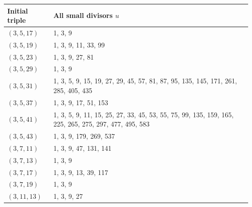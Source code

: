 \small
\setlength{\LTleft}{\fill}
\setlength{\LTright}{\fill}
\begin{longtable}{@{}l p{11.4cm}@{}}
\toprule
Initial triple & All small divisors $u$\\
\midrule
\endhead
$(3,5,17)$ & 1, 3, 9\\[3pt]
$(3,5,19)$ & 1, 3, 9, 11, 33, 99\\[3pt]
$(3,5,23)$ & 1, 3, 9, 27, 81\\[3pt]
$(3,5,29)$ & 1, 3, 9\\[3pt]
$(3,5,31)$ & 1, 3, 5, 9, 15, 19, 27, 29, 45, 57, 81, 87, 95, 135, 145, 171, 261, 285, 405, 435\\[3pt]
$(3,5,37)$ & 1, 3, 9, 17, 51, 153\\[3pt]
$(3,5,41)$ & 1, 3, 5, 9, 11, 15, 25, 27, 33, 45, 53, 55, 75, 99, 135, 159, 165, 225, 265, 275, 297, 477, 495, 583\\[3pt]
$(3,5,43)$ & 1, 3, 9, 179, 269, 537\\[3pt]
$(3,7,11)$ & 1, 3, 9, 47, 131, 141\\[3pt]
$(3,7,13)$ & 1, 3, 9\\[3pt]
$(3,7,17)$ & 1, 3, 9, 13, 39, 117\\[3pt]
$(3,7,19)$ & 1, 3, 9\\[3pt]
$(3,11,13)$ & 1, 3, 9, 27\\[3pt]
\bottomrule
\end{longtable}
\normalsize
